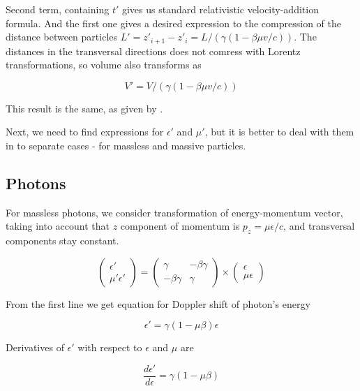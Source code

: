 Second term, containing $t'$ gives us standard  relativistic velocity-addition formula. And the first one gives a desired expression to the compression of the distance between particles $L' = z'_{i+1}-z'_i = L/(\gamma(1-\beta\mu v/c))$. The distances in the transversal directions does not comress with Lorentz transformations, so volume also transforms as

\begin{equation} \label{volume}
V' = V/(\gamma(1-\beta\mu v/c))
\end{equation}

This result is the same, as given by \cite{LandauLifshitz2}.

Next, we need to find expressions for $\epsilon'$ and $\mu'$, but it is better to deal with them in to separate cases - for massless and massive particles.

\subsection{Photons}
For massless photons, we consider transformation of energy-momentum vector, taking into account that $z$ component of momentum is $p_z = \mu \epsilon/c$, and transversal components stay constant.

\begin{equation}\label{lorentz_ph}
	\left(\begin{array}{c}
		\epsilon'\\
		\mu'\epsilon'
	\end{array}
	\right)
	= \left(
	\begin{array}{cc}
		\gamma & -\beta\gamma\\
		-\beta\gamma & \gamma
	\end{array}
	\right)
	\times
	\left(\begin{array}{c}
		\epsilon\\
		\mu\epsilon
	\end{array}
	\right)
\end{equation}

From the first line we get equation for Doppler shift of photon's energy

\begin{equation}\label{doppler_ph}
	\epsilon'=\gamma(1-\mu\beta)\epsilon
\end{equation}

Derivatives of $\epsilon'$ with respect to $\epsilon$ and $\mu$ are

\begin{equation}
	\frac{d\epsilon'}{d\epsilon}=\gamma(1-\mu\beta)
\end{equation}

